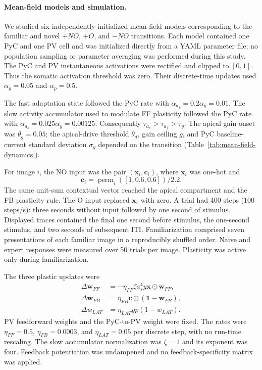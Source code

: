 
\paragraph{Mean-field models and simulation.}
We studied six independently initialized mean-field models corresponding to the
familiar and novel $+NO$, $+O$, and $-NO$ transitions.  Each model contained one
PyC and one PV cell and was initialized directly from a YAML parameter file; no
population sampling or parameter averaging was performed during this study.
The PyC and PV instantaneous activations were rectified and clipped to $[0,1]$.
Thus the somatic activation threshold was zero.  Their discrete-time updates
used $\alpha_y=0.05$ and $\alpha_p=0.5$.

The fast adaptation state followed the PyC rate with
$\alpha_{a_f}=0.2\alpha_y=0.01$.  The slow activity accumulator used to modulate
FF plasticity followed the PyC rate with
$\alpha_{a_s}=0.025\alpha_y=0.00125$.  Consequently
$\tau_{a_s}>\tau_{a_f}>\tau_y$.  The apical gain onset was
$\theta_g=0.05$; the apical-drive threshold $\theta_d$, gain ceiling $g$, and
PyC baseline-current standard deviation $\sigma_y$ depended on the transition
(Table~\ref{tab:mean-field-dynamics}).

For image $i$, the NO input was the pair
$(\mathbf{x}_i,\mathbf{c}_i)$, where $\mathbf{x}_i$ was one-hot and
\begin{equation}
 \mathbf{c}_i = \operatorname{perm}_i([1,0.6,0.6])/2.2.
\end{equation}
The same unit-sum contextual vector reached the apical compartment and the FB
plasticity rule.  The O input replaced $\mathbf{x}_i$ with zero.  A trial had
400 steps ($100$ steps/s): three seconds without input followed by one second
of stimulus.  Displayed traces contained the final one second before stimulus,
the one-second stimulus, and two seconds of subsequent ITI.  Familiarization
comprised seven presentations of each familiar image in a reproducibly shuffled
order.  Naive and expert responses were measured over 50 trials per image.
Plasticity was active only during familiarization.

The three plastic updates were
\begin{align}
 \Delta\mathbf{w}_{FF}
 &= -\eta_{FF}\zeta a_s^4 y\mathbf{x}\odot\mathbf{w}_{FF},\\
 \Delta\mathbf{w}_{FB}
 &= \eta_{FB}\mathbf{c}\odot(\mathbf{1}-\mathbf{w}_{FB}),\\
 \Delta w_{LAT}
 &= \eta_{LAT}yp(1-w_{LAT}).
\end{align}
PV feedforward weights and the PyC-to-PV weight were fixed.  The rates were
$\eta_{FF}=0.5$, $\eta_{FB}=0.0003$, and
$\eta_{LAT}=0.05$ per discrete step, with no run-time rescaling.  The slow
accumulator normalization was $\zeta=1$ and its exponent was four.  Feedback
potentiation was undampened and no feedback-specificity matrix was applied.


